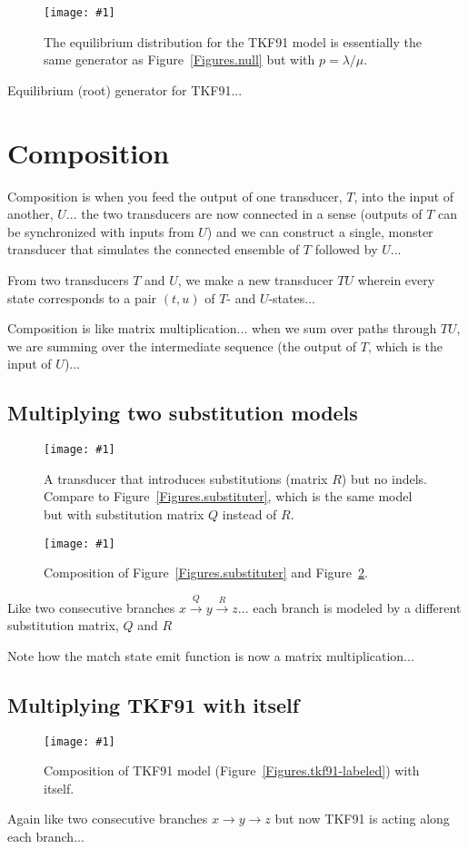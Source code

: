 \documentclass{article}
\newcommand{\figref}[1]{Figure~\ref{Figures.#1}}
\newcommand{\figlabel}[1]{\label{Figures.#1}}
\newcommand{\easyfig}[4]{
\begin{figure}
\texttt{[image: \#1]}
\caption{ \figlabel{#3} #4}
\end{figure}}
\newcommand{\pdffig}[2]{\easyfig{#1-fig.pdf}{}{#1}{#2}}
\newcommand{\widepdffig}[2]{\easyfig{#1-fig.pdf}{width=\textwidth}{#1}{#2}}
\begin{document}
\pdffig{tkf91-root}{The equilibrium distribution for the TKF91 model is essentially the same generator as \figref{null} but with $p=\lambda/\mu$.}

Equilibrium (root) generator for TKF91...


\section{Composition}

Composition is when you feed the output of one transducer, $T$, into the input of another, $U$...
the two transducers are now connected in a sense (outputs of $T$ can be synchronized with inputs from $U$)
and we can construct a single, monster transducer that simulates the connected ensemble of $T$ followed by $U$...

From two transducers $T$ and $U$,
we make a new transducer $TU$
wherein every state corresponds to a pair $(t,u)$ of $T$- and $U$-states...

Composition is like matrix multiplication...
when we sum over paths through $TU$,
we are summing over the intermediate sequence
(the output of $T$, which is the input of $U$)...

\subsection{Multiplying two substitution models}

\pdffig{substituter2}{A transducer that introduces substitutions (matrix $R$) but no indels. Compare to \figref{substituter}, which is the same model but with substitution matrix $Q$ instead of $R$.}

\pdffig{substituter-substituter2}{Composition of \figref{substituter} and \figref{substituter2}.}

Like two consecutive branches $x \stackrel{Q}{\to} y \stackrel{R}{\to} z$...
each branch is modeled by a different substitution matrix, $Q$ and $R$

Note how the match state emit function is now a matrix multiplication...

\subsection{Multiplying TKF91 with itself}

\widepdffig{tkf91-tkf91}{Composition of TKF91 model (\figref{tkf91-labeled}) with itself.}

Again like two consecutive branches $x \to y \to z$
but now TKF91 is acting along each branch...
\end{document}
